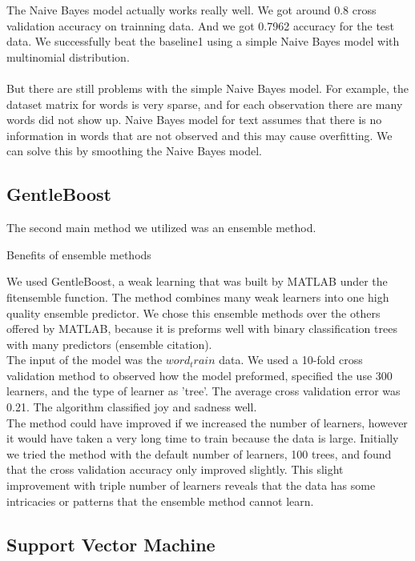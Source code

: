 \documentclass[]{article}
\begin{document}
The Naive Bayes model actually works really well. We got around 0.8 cross validation accuracy on trainning data. And we got 0.7962 accuracy for the test data. We successfully beat the baseline1 using a simple Naive Bayes model with multinomial distribution. \\\\

But there are still problems with the simple Naive Bayes model. For example, the dataset matrix for words is very sparse, and for each observation there are many  words did not show up. Naive Bayes model for text assumes that there is no information in words that are not observed and this may cause overfitting. We can solve this by smoothing the Naive Bayes model.

\subsection{GentleBoost}

The second main method we utilized was an ensemble method. 

Benefits of ensemble methods 



We used GentleBoost, a weak learning that was built by MATLAB under the fitensemble function. The method combines many weak learners into one high quality ensemble predictor. We chose this ensemble methods over the others offered by MATLAB, because it is preforms well with binary classification trees with many predictors (ensemble citation). \\

The input of the model was the $word_train$ data. We used a 10-fold cross validation method to observed how the model preformed, specified the use 300 learners, and the type of learner as 'tree'. The average cross validation error was 0.21. The algorithm classified joy and sadness well. \\

The method could have improved if we increased the number of learners, however it would have taken a very long time to train because the data is large. Initially we tried the method with the default number of learners, 100 trees, and found that the cross validation accuracy only improved slightly. This slight improvement with triple number of learners reveals that the data has some intricacies or patterns that the ensemble method cannot learn.   


\subsection{Support Vector Machine}
\end{document}
